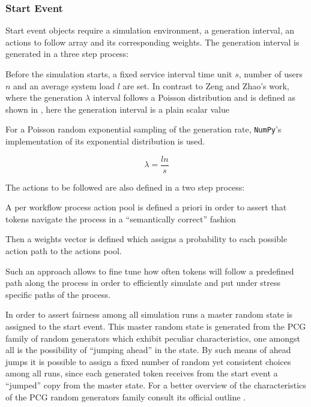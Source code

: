 \documentclass{seal_thesis}
\begin{document}
\subsubsection{Start Event}

Start event objects require a simulation environment, a generation interval, an actions to follow array and its corresponding weights. The generation interval is generated in a three step process:
\begin{enumerate*}
 	\item Before the simulation starts, a fixed service interval time unit $s$, number of users $n$ and an average system load $l$ are set. In contrast to Zeng and Zhao's work, where the generation $\lambda$ interval follows a Poisson distribution \cite{Zeng2005} and is defined as shown in , here the generation interval is a plain scalar value
 	\item For a Poisson random exponential sampling of the generation rate, \texttt{NumPy}'s implementation of its exponential distribution is used.
 \end{enumerate*}

\begin{equation}
\label{eq:generation_interval}
	\lambda = \frac{l n}{s}
\end{equation}

The actions to be followed are also defined in a two step process:
\begin{enumerate*}
	\item A per workflow process action pool is defined a priori in order to assert that tokens navigate the process in a ``semantically correct'' fashion
	\item Then a weights vector is defined which assigns a probability to each possible action path to the actions pool.
\end{enumerate*}

Such an approach allows to fine tune how often tokens will follow a predefined path along the process in order to efficiently simulate and put under stress specific paths of the process.

In order to assert fairness among all simulation runs a master random state is assigned to the start event. This master random state is generated from the PCG family of random generators which exhibit peculiar characteristics, one amongst all is the possibility of ``jumping ahead'' in the state. By such means of ahead jumps it is possible to assign a fixed number of random yet consistent choices among all runs, since each generated token receives from the start event a ``jumped'' copy from the master state. For a better overview of the characteristics of the PCG random generators family consult its official outline .
\end{document}
